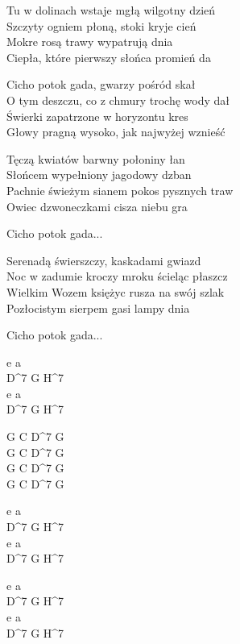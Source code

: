 \begin{text}
	Tu w dolinach wstaje mgłą wilgotny dzień\\
	Szczyty ogniem płoną, stoki kryje cień\\
	Mokre rosą trawy wypatrują dnia\\
	Ciepła, które pierwszy słońca promień da    

    	\vin Cicho potok gada, gwarzy pośród skał\\
	\vin O tym deszczu, co z chmury trochę wody dał\\
	\vin Świerki zapatrzone w horyzontu kres\\
	\vin Głowy pragną wysoko, jak najwyżej wznieść
	
    	Tęczą kwiatów barwny połoniny łan\\
	Słońcem wypełniony jagodowy dzban\\
	Pachnie świeżym sianem pokos pysznych traw\\
	Owiec dzwoneczkami cisza niebu gra

    	\vin Cicho potok gada...

    	Serenadą świerszczy, kaskadami gwiazd\\
	Noc w zadumie kroczy mroku ścieląc płaszcz\\
	Wielkim Wozem księżyc rusza na swój szlak\\
	Pozłocistym sierpem gasi lampy dnia
	
	\vin Cicho potok gada...
\end{text}
\begin{chord}
    	e a\\
	D^7 G H^7\\
	e a\\
	D^7 G H^7
	
	G C D^7 G\\
	G C D^7 G\\
	G C D^7 G\\
	G C D^7 G
    
    	e a\\
	D^7 G H^7\\
	e a\\
	D^7 G H^7\\
    	\hfill\break
    
    	e a\\
	D^7 G H^7\\
	e a\\
	D^7 G H^7
\end{chord}
